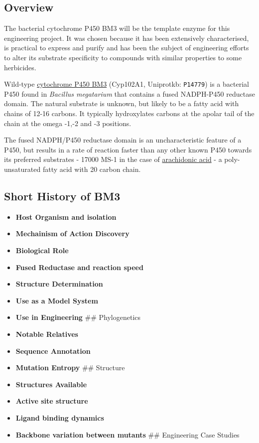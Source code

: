 \hypertarget{overview-1}{%
\subsection{Overview}\label{overview-1}}

The bacterial cytochrome P450 BM3 will be the template enzyme for this
engineering project. It was chosen because it has been extensively
characterised, is practical to express and purify and has been the
subject of engineering efforts to alter its substrate specificity to
compounds with similar properties to some herbicides.

Wild-type \href{https://www.uniprot.org/uniprot/P14779}{cytochrome P450
BM3} (Cyp102A1, Uniprotkb: \texttt{P14779}) is a bacterial P450 found in
\emph{Bacillus megatarium} that contains a fused NADPH-P450 reductase
domain. The natural substrate is unknown, but likely to be a fatty acid
with chains of 12-16 carbons. It typically hydroxylates carbons at the
apolar tail of the chain at the omega -1,-2 and -3 positions.

The fused NADPH/P450 reductase domain is an uncharacteristic feature of
a P450, but results in a rate of reaction faster than any other known
P450 towards its preferred substrates - 17000 MS-1 in the case of
\href{https://pubchem.ncbi.nlm.nih.gov/compound/Arachidonic-acid}{arachidonic
acid} - a poly-unsaturated fatty acid with 20 carbon chain.

\hypertarget{short-history-of-bm3}{%
\subsection{Short History of BM3}\label{short-history-of-bm3}}

\begin{itemize}
\tightlist
\item
  \textbf{Host Organism and isolation}
\item
  \textbf{Mechainism of Action Discovery}
\item
  \textbf{Biological Role}
\item
  \textbf{Fused Reductase and reaction speed}
\item
  \textbf{Structure Determination}
\item
  \textbf{Use as a Model System}
\item
  \textbf{Use in Engineering} \#\# Phylogenetics
\item
  \textbf{Notable Relatives}
\item
  \textbf{Sequence Annotation}
\item
  \textbf{Mutation Entropy} \#\# Structure
\item
  \textbf{Structures Available}
\item
  \textbf{Active site structure}
\item
  \textbf{Ligand binding dynamics}
\item
  \textbf{Backbone variation between mutants} \#\# Engineering Case
  Studies
\end{itemize}

